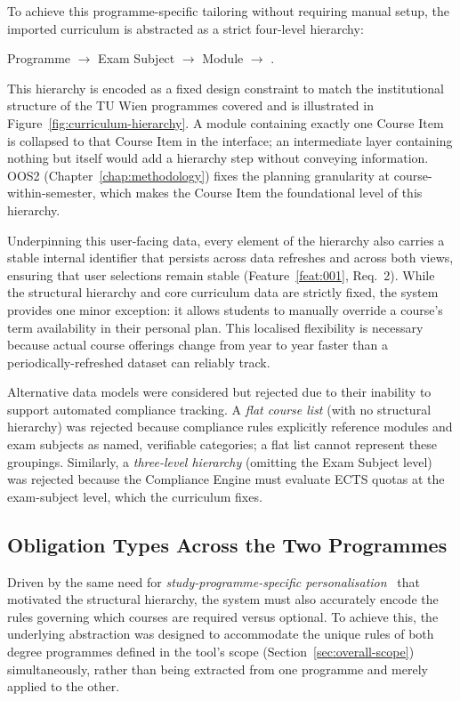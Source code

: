 To achieve this programme-specific tailoring without requiring manual setup, the imported curriculum is abstracted as a strict four-level hierarchy: 

Programme $\to$ Exam Subject $\to$ Module $\to$ . 

This hierarchy is encoded as a fixed design constraint to match the institutional structure of the TU Wien programmes covered and is illustrated in Figure~\ref{fig:curriculum-hierarchy}. A module containing exactly one Course Item is collapsed to that Course Item in the interface; an intermediate layer containing nothing but itself would add a hierarchy step without conveying information. OOS2 (Chapter~\ref{chap:methodology}) fixes the planning granularity at course-within-semester, which makes the Course Item the foundational level of this hierarchy.

Underpinning this user-facing data, every element of the hierarchy also carries a stable internal identifier that persists across data refreshes and across both views, ensuring that user selections remain stable (Feature~\ref{feat:001}, Req.~2). While the structural hierarchy and core curriculum data are strictly fixed, the system provides one minor exception: it allows students to manually override a course's term availability in their personal plan. This localised flexibility is necessary because actual course offerings change from year to year faster than a periodically-refreshed dataset can reliably track. 

Alternative data models were considered but rejected due to their inability to support automated compliance tracking. A \emph{flat course list} (with no structural hierarchy) was rejected because compliance rules explicitly reference modules and exam subjects as named, verifiable categories; a flat list cannot represent these groupings. Similarly, a \emph{three-level hierarchy} (omitting the Exam Subject level) was rejected because the Compliance Engine must evaluate ECTS quotas at the exam-subject level, which the curriculum fixes.


\subsection{Obligation Types Across the Two Programmes}
\label{sec:course-obligation-abstraction}

Driven by the same need for \emph{study-programme-specific personalisation}~\cite{bartel_design_2024} that motivated the structural hierarchy, the system must also accurately encode the rules governing which courses are required versus optional. To achieve this, the underlying abstraction was designed to accommodate the unique rules of both degree programmes defined in the tool's scope (Section~\ref{sec:overall-scope}) simultaneously, rather than being extracted from one programme and merely applied to the other. 

